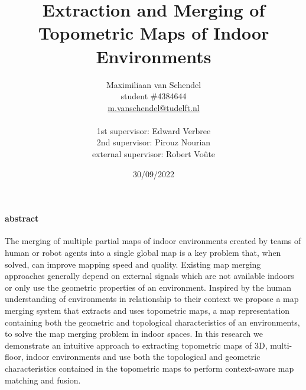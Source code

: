 \documentclass{article}
\title{Extraction and Merging of Topometric Maps of Indoor Environments}
\author{
  Maximiliaan van Schendel\\
  student \#4384644 \\
  \url{m.vanschendel@tudelft.nl}\\
  \\
  1st supervisor: Edward Verbree \\
  2nd supervisor: Pirouz Nourian \\
  external supervisor: Robert Voûte \\
}
\date{30/09/2022}
\begin{document}



\maketitle
\pagebreak

\tableofcontents
\newpage



\paragraph{abstract}
The merging of multiple partial \gls{map}s of indoor environments created by teams of human or robot agents into a single global map is a key problem that, when solved, can improve mapping speed and quality. Existing map merging approaches generally depend on external signals which are not available indoors or only use the geometric properties of an environment. Inspired by the human understanding of environments in relationship to their context we propose a map merging system that extracts and uses topometric maps, a map representation containing both the geometric and topological characteristics of an environments, to solve the map merging problem in indoor spaces. In this research we demonstrate an intuitive approach to extracting topometric maps of 3D, multi-floor, indoor environments and use both the topological and geometric characteristics contained in the topometric maps to perform context-aware map matching and fusion. 


\clearpage
\printnoidxglossaries



\pagebreak

\pagebreak

\pagebreak                                                     

\pagebreak





\end{document}
